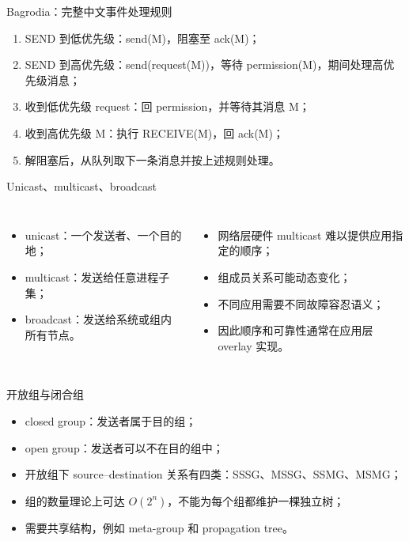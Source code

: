 \documentclass[UTF8,fontset=none,aspectratio=169,10pt]{beamer}
\begin{document}
{\begin{frame}{Bagrodia：完整中文事件处理规则}
\scriptsize
\begin{enumerate}
  \item SEND 到低优先级：send(M)，阻塞至 ack(M)；
  \item SEND 到高优先级：send(request(M))，等待 permission(M)，期间处理高优先级消息；
  \item 收到低优先级 request：回 permission，并等待其消息 M；
  \item 收到高优先级 M：执行 RECEIVE(M)，回 ack(M)；
  \item 解阻塞后，从队列取下一条消息并按上述规则处理。
\end{enumerate}
\normalsize
\end{frame}


\begin{frame}{Unicast、multicast、broadcast}
\begin{columns}[T,onlytextwidth]
\begin{itemize}
  \item unicast：一个发送者、一个目的地；
  \item multicast：发送给任意进程子集；
  \item broadcast：发送给系统或组内所有节点。
\end{itemize}
\begin{itemize}
  \item 网络层硬件 multicast 难以提供应用指定的顺序；
  \item 组成员关系可能动态变化；
  \item 不同应用需要不同故障容忍语义；
  \item 因此顺序和可靠性通常在应用层 overlay 实现。
\end{itemize}
\end{columns}
\end{frame}

\begin{frame}{开放组与闭合组}
\begin{itemize}
  \item closed group：发送者属于目的组；
  \item open group：发送者可以不在目的组中；
  \item 开放组下 source--destination 关系有四类：SSSG、MSSG、SSMG、MSMG；
  \item 组的数量理论上可达 $O(2^n)$，不能为每个组都维护一棵独立树；
  \item 需要共享结构，例如 meta-group 和 propagation tree。
\end{itemize}
\end{frame}

}
\end{document}
